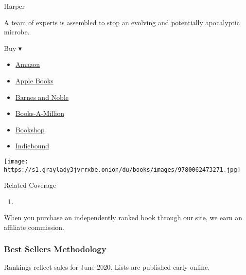 \begin{enumerate}
  Harper

  A team of experts is assembled to stop an evolving and potentially
  apocalyptic microbe.

  Buy ▾

  \begin{itemize}
  \tightlist
  \item
    \href{https://www.amazon.com/Andromeda-Evolution-Michael-Crichton/dp/0062473271?tag=NYTBS-20}{Amazon}
  \item
    \href{https://du-gae-books-dot-nyt-du-prd.appspot.com/buy?title=MICHAEL+CRICHTON\%3A+THE+ANDROMEDA+EVOLUTION\&author=Daniel+H+Wilson}{Apple
    Books}
  \item
    \href{https://www.anrdoezrs.net/click-7990613-11819508?url=https\%3A\%2F\%2Fwww.barnesandnoble.com\%2Fw\%2F\%3Fean\%3D9780062473349}{Barnes
    and Noble}
  \item
    \href{https://www.anrdoezrs.net/click-7990613-35140?url=https\%3A\%2F\%2Fwww.booksamillion.com\%2Fp\%2FMICHAEL\%2BCRICHTON\%253A\%2BTHE\%2BANDROMEDA\%2BEVOLUTION\%2FDaniel\%2BH\%2BWilson\%2F9780062473349}{Books-A-Million}
  \item
    \href{https://bookshop.org/a/3546/9780062473349}{Bookshop}
  \item
    \href{https://www.indiebound.org/book/9780062473349?aff=NYT}{Indiebound}
  \end{itemize}

  \texttt{[image: https://s1.graylady3jvrrxbe.onion/du/books/images/9780062473271.jpg]}
\end{enumerate}

Related Coverage

\begin{enumerate}
\def\labelenumi{\arabic{enumi}.}
\tightlist
\item
  \href{https://www.nytimes3xbfgragh.onion/2020/07/31/books/review/the-system-robert-reich-break-em-up-zephyr-teachout.html}{}
\end{enumerate}

When you purchase an independently ranked book through our site, we earn
an affiliate commission.

\hypertarget{best-sellers-methodology}{%
\subsubsection{Best Sellers
Methodology}\label{best-sellers-methodology}}

Rankings reflect sales for June 2020. Lists are published early online.

